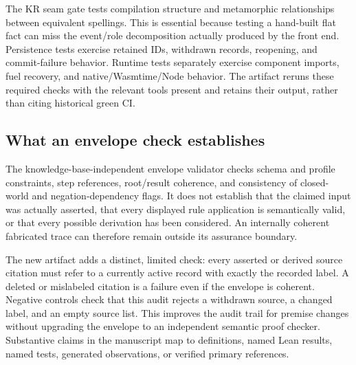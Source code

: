 The KR seam gate tests compilation structure and metamorphic relationships
between equivalent spellings. This is essential because testing a hand-built
flat fact can miss the event/role decomposition actually produced by the
front end. Persistence tests exercise retained IDs, withdrawn records,
reopening, and commit-failure behavior. Runtime tests separately exercise
component imports, fuel recovery, and native/Wasmtime/Node behavior.
The artifact reruns these required checks with the relevant tools present
and retains their output, rather than citing historical green CI.

\subsection{What an envelope check establishes}

The knowledge-base-independent envelope validator checks schema and profile
constraints, step references, root/result coherence, and consistency of
closed-world and negation-dependency flags. It does not establish that the
claimed input was actually asserted, that every displayed rule application is
semantically valid, or that every possible derivation has been considered.
An internally coherent fabricated trace can therefore remain outside its
assurance boundary.

The new artifact adds a distinct, limited check: every asserted or derived source
citation must refer to a currently active record with exactly the recorded label.
A deleted or mislabeled citation is a failure even if the envelope is coherent.
Negative controls check that this audit rejects a withdrawn source, a changed
label, and an empty source list. This improves the audit trail for premise
changes without upgrading the envelope to an independent semantic proof checker.
Substantive claims in the manuscript map to definitions, named Lean results,
named tests, generated observations, or verified primary references.
